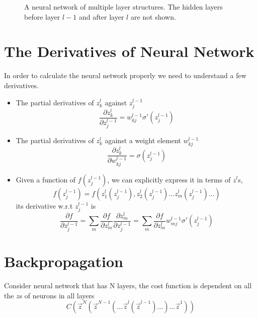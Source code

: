 \documentclass[12pt, oneside]{article}
\begin{document}
\begin{center}
\begin{figure}

\caption{A neural network of multiple layer structures. The hidden layers before layer $l-1$ and after layer $l$ are not shown. }
\end{figure}
\end{center}


\section{The Derivatives of Neural Network}
In order to calculate the neural network properly we need to understand a few derivatives.

\begin{itemize}
\item The partial derivatives of $z^{l}_k$ against $z^{l-1}_j$
\begin{equation}
\frac{\partial z^{l}_k}{\partial z_j^{l-1}}=w^{l-1}_{kj}\sigma'(z^{l-1}_j)
\end{equation}

\item The partial derivatives of $z^{l}_k$ against a weight element $w_{kj}^{l-1}$
\begin{equation}
\frac{\partial z^{l}_k}{\partial w_{kj}^{l-1}}=\sigma(z^{l-1}_j)
\end{equation}

\item Given a function of $f(z^{l-1}_j)$, we can explicitly express it in terms of $z^{l}$s,
$$
f(z^{l-1}_j)=f(z^l_1(z^{l-1}_j), z^l_2(z^{l-1}_j)...z^l_m(z^{l-1}_j)...)
$$
its derivative w.r.t $z^{l-1}_j$ is
\begin{equation}
\frac{\partial f}{\partial z^{l-1}_j}=\sum\limits_m \frac{\partial f}{\partial z^{l}_m}\frac{\partial z^l_m}{\partial z^{l-1}_j}=\sum\limits_m \frac{\partial f}{\partial z^{l}_m}w^{l-1}_{mj}\sigma'(z^{l-1}_j)
\end{equation}

\end{itemize}



\section{Backpropagation}
Consider neural network that has N layers, the cost function is dependent on all the $z$s of neurons in all layers
\begin{equation}
C\left(\vec{z}^N(\vec{z}^{N-1}(...\vec{z}^{l}(\vec{z}^{l-1})...) ...\vec{z}^1)\right)
\end{equation}
\end{document}
